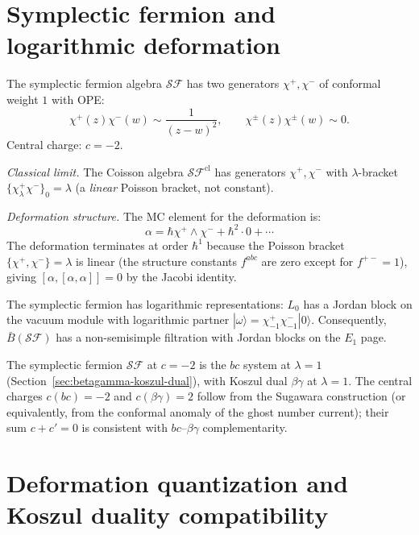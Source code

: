 \section{Symplectic fermion and logarithmic deformation}
\label{sec:symplectic-fermion-deformation}

\begin{computation}
\label{comp:symplectic-fermion-dq}

The symplectic fermion algebra $\mathcal{SF}$ has two generators
$\chi^+, \chi^-$ of conformal weight $1$ with OPE:
\[
\chi^+(z) \chi^-(w) \sim \frac{1}{(z-w)^2}, \qquad
\chi^\pm(z) \chi^\pm(w) \sim 0.
\]
Central charge: $c = -2$.

\emph{Classical limit.}
The Coisson algebra $\mathcal{SF}^{\mathrm{cl}}$ has generators
$\chi^+, \chi^-$ with $\lambda$-bracket
$\{\chi^+_\lambda \chi^-\}_0 = \lambda$ (a \emph{linear}
Poisson bracket, not constant).

\emph{Deformation structure.}
The MC element for the deformation is:
\[
\alpha = \hbar \chi^+ \wedge \chi^-
+ \hbar^2 \cdot 0 + \cdots
\]
The deformation terminates at order $\hbar^1$ because the
Poisson bracket $\{\chi^+, \chi^-\} = \lambda$ is linear
(the structure constants $f^{abc}$ are zero except for
$f^{+-} = 1$), giving $[\alpha, [\alpha, \alpha]] = 0$ by
the Jacobi identity.

The symplectic fermion has logarithmic representations: $L_0$ has a Jordan block on the vacuum module with logarithmic partner $|\omega\rangle = \chi^+_{-1}\chi^-_{-1}|0\rangle$. Consequently, $\bar{B}(\mathcal{SF})$ has a non-semisimple filtration with Jordan blocks on the $E_1$ page.
\end{computation}

\begin{remark}
\label{rem:sf-koszul-dual}
The symplectic fermion $\mathcal{SF}$ at $c = -2$ is the $bc$ system at $\lambda = 1$ (Section~\ref{sec:betagamma-koszul-dual}), with Koszul dual $\beta\gamma$ at $\lambda = 1$. The central charges $c(bc) = -2$ and $c(\beta\gamma) = 2$ follow from the Sugawara construction (or equivalently, from the conformal anomaly of the ghost number current); their sum $c + c' = 0$ is consistent with $bc$--$\beta\gamma$ complementarity.
\end{remark}


\section{Deformation quantization and Koszul duality compatibility}
\label{sec:dq-koszul-compatibility}

